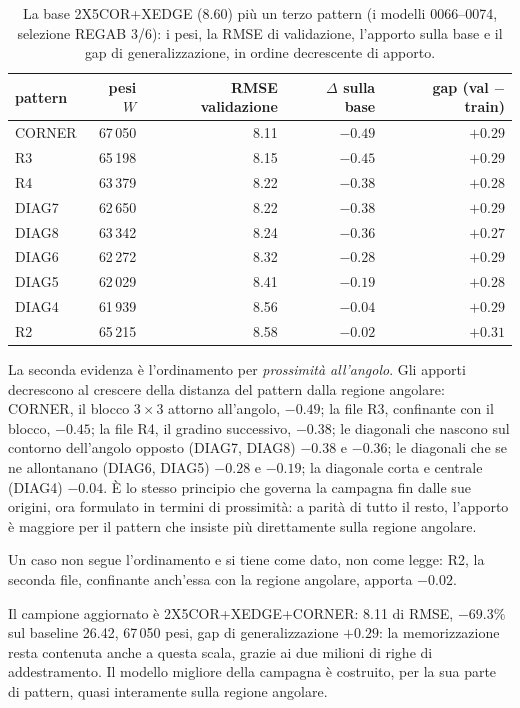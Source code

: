 \begin{table}[ht]
\centering
\begin{tabular}{lrrrr}
\toprule
pattern & pesi $W$ & RMSE validazione & $\Delta$ sulla base & gap (val $-$ train) \\
\midrule
CORNER & 67\,050 & 8.11 & $-0.49$ & $+0.29$ \\
R3     & 65\,198 & 8.15 & $-0.45$ & $+0.29$ \\
R4     & 63\,379 & 8.22 & $-0.38$ & $+0.28$ \\
DIAG7  & 62\,650 & 8.22 & $-0.38$ & $+0.29$ \\
DIAG8  & 63\,342 & 8.24 & $-0.36$ & $+0.27$ \\
DIAG6  & 62\,272 & 8.32 & $-0.28$ & $+0.29$ \\
DIAG5  & 62\,029 & 8.41 & $-0.19$ & $+0.28$ \\
DIAG4  & 61\,939 & 8.56 & $-0.04$ & $+0.29$ \\
R2     & 65\,215 & 8.58 & $-0.02$ & $+0.31$ \\
\bottomrule
\end{tabular}
\caption{La base 2X5COR+XEDGE (8.60) più un terzo pattern (i modelli
0066--0074, selezione REGAB 3/6): i pesi, la RMSE di validazione,
l'apporto sulla base e il gap di generalizzazione, in ordine
decrescente di apporto.}
\label{tab:feature-base-pattern-secondo-livello}
\end{table}

La seconda evidenza è l'ordinamento per \emph{prossimità
all'angolo}. Gli apporti decrescono al crescere della distanza del
pattern dalla regione angolare: CORNER, il blocco $3\times3$
attorno all'angolo, $-0.49$; la file R3, confinante con il blocco,
$-0.45$; la file R4, il gradino successivo, $-0.38$; le diagonali
che nascono sul contorno dell'angolo opposto (DIAG7, DIAG8) $-0.38$
e $-0.36$; le diagonali che se ne allontanano (DIAG6, DIAG5)
$-0.28$ e $-0.19$; la diagonale corta e centrale (DIAG4) $-0.04$. È
lo stesso principio che governa la campagna fin dalle sue origini,
ora formulato in termini di prossimità: a parità di tutto il resto,
l'apporto è maggiore per il pattern che insiste più direttamente
sulla regione angolare.

Un caso non segue l'ordinamento e si tiene come dato, non come
legge: R2, la seconda file, confinante anch'essa con la regione
angolare, apporta $-0.02$.

Il campione aggiornato è 2X5COR+XEDGE+CORNER: 8.11 di RMSE,
$-69.3\%$ sul baseline 26.42, 67\,050 pesi, gap di
generalizzazione $+0.29$: la memorizzazione resta contenuta anche a
questa scala, grazie ai due milioni di righe di addestramento. Il
modello migliore della campagna è costruito, per la sua parte di
pattern, quasi interamente sulla regione angolare.

